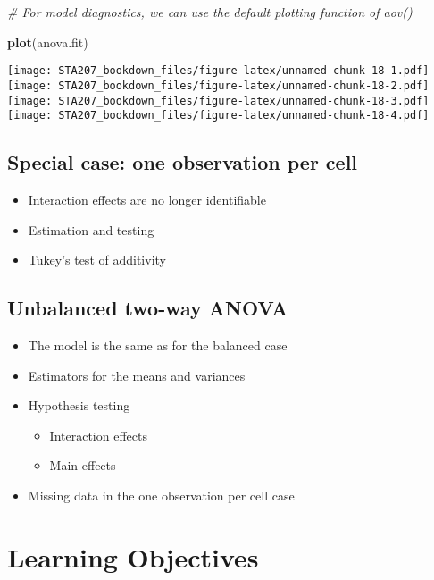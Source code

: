 \documentclass[12pt,]{book}
\newenvironment{Shaded}{\begin{snugshade}}{\end{snugshade}}
\newcommand{\KeywordTok}[1]{\textcolor[rgb]{0.13,0.29,0.53}{\textbf{#1}}}
\newcommand{\CommentTok}[1]{\textcolor[rgb]{0.56,0.35,0.01}{\textit{#1}}}
\newcommand{\NormalTok}[1]{#1}
\providecommand{\tightlist}{%
  \setlength{\itemsep}{0pt}\setlength{\parskip}{0pt}}
\begin{document}
\begin{Shaded}
\begin{Highlighting}[]
\CommentTok{# For model diagnostics, we can use the default plotting function of aov()}

\KeywordTok{plot}\NormalTok{(anova.fit)}
\end{Highlighting}
\end{Shaded}

\texttt{[image: STA207\_bookdown\_files/figure-latex/unnamed-chunk-18-1.pdf]}
\texttt{[image: STA207\_bookdown\_files/figure-latex/unnamed-chunk-18-2.pdf]}
\texttt{[image: STA207\_bookdown\_files/figure-latex/unnamed-chunk-18-3.pdf]}
\texttt{[image: STA207\_bookdown\_files/figure-latex/unnamed-chunk-18-4.pdf]}

\subsection{Special case: one observation per
cell}\label{special-case-one-observation-per-cell}

\begin{itemize}
\tightlist
\item
  Interaction effects are no longer identifiable
\item
  Estimation and testing
\item
  Tukey's test of additivity
\end{itemize}

\subsection{Unbalanced two-way ANOVA}\label{unbalanced-two-way-anova}

\begin{itemize}
\tightlist
\item
  The model is the same as for the balanced case
\item
  Estimators for the means and variances
\item
  Hypothesis testing

  \begin{itemize}
  \tightlist
  \item
    Interaction effects
  \item
    Main effects
  \end{itemize}
\item
  Missing data in the one observation per cell case
\end{itemize}

\section{Learning Objectives}\label{learning-objectives-2}
\end{document}

